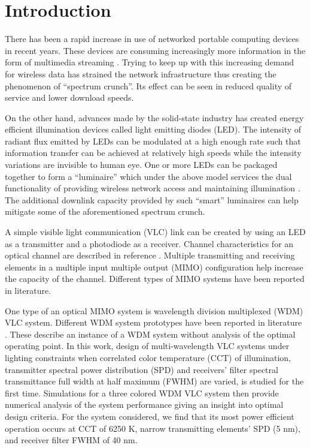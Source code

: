 \section{Introduction}
There has been a rapid increase in use of networked portable computing devices in recent years. These devices are consuming increasingly more information in the form of multimedia streaming \cite{cis14a}. Trying to keep up with this increasing demand for wireless data has strained the network infrastructure thus creating the phenomenon of ``spectrum crunch''. Its effect can be seen in reduced quality of service and lower download speeds. 

On the other hand, advances made by the solid-state industry has created energy efficient illumination devices called light emitting diodes (LED). The intensity of radiant flux emitted by LEDs can be modulated at a high enough rate such that information transfer can be achieved at relatively high speeds while the intensity variations are invisible to human eye. One or more LEDs can be packaged together to form a ``luminaire'' which under the above model services the dual functionality of providing wireless network access and maintaining illumination \cite{kom04a}. The additional downlink capacity provided by such ``smart'' luminaires can help mitigate some of the aforementioned spectrum crunch.

A simple visible light communication (VLC) link can be created by using an LED as a transmitter and a photodiode as a receiver. Channel characteristics for an optical channel are described in reference \cite{kah97a}. Multiple transmitting and receiving elements in a multiple input multiple output (MIMO) configuration help increase the capacity of the channel. Different types of MIMO systems \cite{hra06a,zen09a,ash10a,but13a,but14b} have been reported in literature.

One type of an optical MIMO system is wavelength division multiplexed (WDM) VLC system. Different WDM system prototypes have been reported in literature \cite{wan11a,kot12a,cos12a}. These describe an instance of a WDM system without analysis of the optimal operating point. In this work, design of multi-wavelength VLC systems under lighting constraints when correlated color temperature (CCT) of illumination, transmitter spectral power distribution (SPD) and receivers' filter spectral transmittance full width at half maximum (FWHM) are varied, is studied for the first time. Simulations for a three colored WDM VLC system then provide numerical analysis of the system performance giving an insight into optimal design criteria. For the system considered, we find that its most power efficient operation occurs at CCT of 6250 K, narrow transmitting elements' SPD (5 nm), and receiver filter FWHM of 40 nm.

